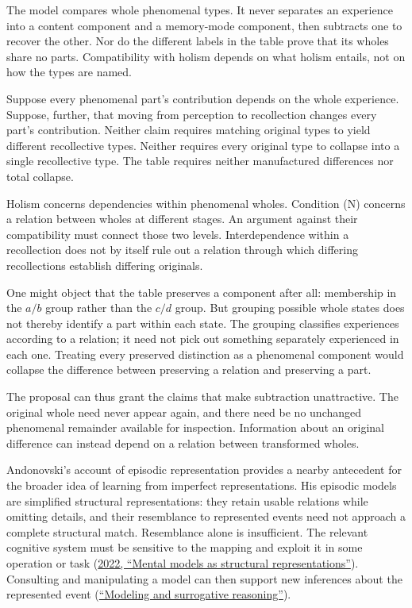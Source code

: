 The model compares whole phenomenal types. It never separates an experience into a content component and a memory-mode component, then subtracts one to recover the other. Nor do the different labels in the table prove that its wholes share no parts. Compatibility with holism depends on what holism entails, not on how the types are named.

Suppose every phenomenal part's contribution depends on the whole experience. Suppose, further, that moving from perception to recollection changes every part's contribution. Neither claim requires matching original types to yield different recollective types. Neither requires every original type to collapse into a single recollective type. The table requires neither manufactured differences nor total collapse.

Holism concerns dependencies within phenomenal wholes. Condition (N) concerns a relation between wholes at different stages. An argument against their compatibility must connect those two levels. Interdependence within a recollection does not by itself rule out a relation through which differing recollections establish differing originals.

One might object that the table preserves a component after all: membership in the \(a/b\) group rather than the \(c/d\) group. But grouping possible whole states does not thereby identify a part within each state. The grouping classifies experiences according to a relation; it need not pick out something separately experienced in each one. Treating every preserved distinction as a phenomenal component would collapse the difference between preserving a relation and preserving a part.

The proposal can thus grant the claims that make subtraction unattractive. The original whole need never appear again, and there need be no unchanged phenomenal remainder available for inspection. Information about an original difference can instead depend on a relation between transformed wholes.

Andonovski's account of episodic representation provides a nearby antecedent for the broader idea of learning from imperfect representations. His episodic models are simplified structural representations: they retain usable relations while omitting details, and their resemblance to represented events need not approach a complete structural match. Resemblance alone is insufficient. The relevant cognitive system must be sensitive to the mapping and exploit it in some operation or task (\hyperlink{ref:andonovski2022}{2022, “Mental models as structural representations”}). Consulting and manipulating a model can then support new inferences about the represented event (\hyperlink{ref:andonovski2022}{“Modeling and surrogative reasoning”}).

